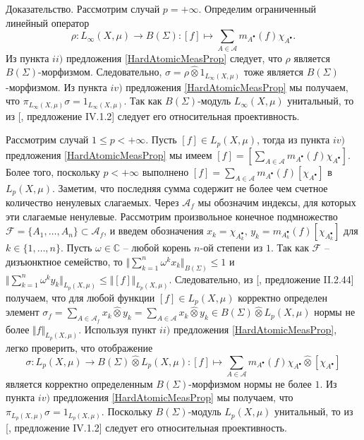 \documentclass[12pt]{article}
\numberwithin{equation}{subsection}
\theoremstyle{plain}
\newenvironment{proof}{Доказательство.}{}
\newcommand{\projtens}{\mathbin{\widehat{\otimes}}}
\begin{document}
\begin{fulltext}
\begin{proof}
        Рассмотрим случай $p=+\infty$. Определим ограниченный линейный оператор
        $$
            \rho:L_\infty(X,\mu)\to B(\Sigma):[f]\mapsto\sum_{A\in\mathcal{A}}m_{A^\bullet}(f)\chi_{A^\bullet}.
        $$
        Из пункта $ii)$ предложения \ref{HardAtomicMeasProp} следует, что $\rho$ является $B(\Sigma)$-морфизмом. Следовательно, $\sigma=\rho\projtens 1_{L_\infty(X,\mu)}$ тоже является $B(\Sigma)$-морфизмом. Из пункта $iv)$ предложения \ref{HardAtomicMeasProp} мы получаем, что $\pi_{L_\infty(X,\mu)}\sigma=1_{L_\infty(X,\mu)}$. Так как $B(\Sigma)$-модуль $L_\infty(X,\mu)$ унитальный, то из [\cite{HelHomolBanTopAlg}, предложение IV.1.2] следует его относительная проективность.

        Рассмотрим случай $1\leq p<+\infty$. Пусть $[f]\in L_p(X,\mu)$, тогда из пункта $iv)$ предложения \ref{HardAtomicMeasProp} мы имеем $[f]=[\sum_{A\in\mathcal{A}}m_{A^\bullet}(f)\chi_{A^\bullet}]$. Более того, поскольку $p<+\infty$ выполнено $[f]=\sum_{A\in\mathcal{A}}m_{A^\bullet}(f)[\chi_{A^\bullet}]$ в $L_p(X,\mu)$. Заметим, что последняя сумма содержит не более чем счетное количество ненулевых слагаемых. Через $\mathcal{A}_f$ мы обозначим индексы, для которых эти слагаемые ненулевые. Рассмотрим произвольное конечное подмножество $\mathcal{F}=\{A_1,\ldots,A_n\}\subset\mathcal{A}_f$, и введем обозначения $x_k=\chi_{A_k^\bullet}$, $y_k=m_{A_k^\bullet}(f)[\chi_{A_k^\bullet}]$ для $k\in\{1,\ldots,n\}$. Пусть $\omega\in\mathbb{C}$ -- любой корень $n$-ой степени из $1$. Так как $\mathcal{F}$ -- дизъюнктное семейство, то $\Vert\sum_{k=1}^n \omega^k x_k\Vert_{B(\Sigma)}\leq 1$ и $\Vert \sum_{k=1}^n\omega^k y_k\Vert_{L_p(X,\mu)}\leq\Vert [f]\Vert_{L_p(X,\mu)}$. Следовательно, из [\cite{HelHomolBanTopAlg}, предложение II.2.44] получаем, что для любой функции $[f]\in L_p(X,\mu)$ корректно определен элемент $\sigma_f=\sum_{A\in\mathcal{A}_f} x_k\projtens y_k=\sum_{A\in\mathcal{A}} x_k\projtens y_k\in B(\Sigma)\projtens L_p(X,\mu)$ нормы не более $\Vert f\Vert_{L_p(X,\mu)}$. Используя пункт $ii)$ предложения \ref{HardAtomicMeasProp}, легко проверить, что отображение
        $$
            \sigma: L_p(X,\mu)\to B(\Sigma)\projtens L_p(X,\mu):[f]\mapsto \sum_{A\in\mathcal{A}}m_{A^\bullet}(f)\chi_{A^\bullet}\projtens[\chi_{A^\bullet}]
        $$
        является корректно определенным $B(\Sigma)$-морфизмом нормы не более $1$. Из пункта $iv)$ предложения \ref{HardAtomicMeasProp} мы получаем, что $\pi_{L_p(X,\mu)}\sigma=1_{L_p(X,\mu)}$. Поскольку $B(\Sigma)$-модуль $L_p(X,\mu)$ унитальный, то из [\cite{HelHomolBanTopAlg}, предложение IV.1.2] следует его относительная проективность.
    \end{proof}


\end{fulltext}
\end{document}
